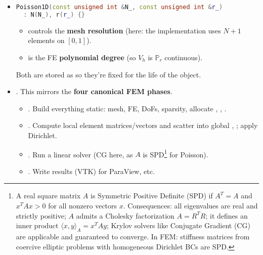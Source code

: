 \begin{itemize}
    \item {}
    \begin{lstlisting}[language=C++]
Poisson1D(const unsigned int &N_, const unsigned int &r_)
  : N(N_), r(r_) {}\end{lstlisting}
    \begin{itemize}
        \item {} controls the \textbf{mesh resolution} (here: the implementation uses $N+1$ elements on $\left[0,1\right]$).
        \item {} is the FE \textbf{polynomial degree} (so $V_{h}$ is $\mathbb{P}_{r}$ continuous).
    \end{itemize}
    Both are stored as  so they're fixed for the life of the object.


    \item {}. This mirrors the \textbf{four canonical FEM phases}.
    \begin{itemize}
        \item {}. Build everything static: mesh, FE, DoFs, sparsity, allocate , , .
        \item {}. Compute local element matrices/vectors and scatter into global , ; apply Dirichlet.
        \item {}. Run a linear solver (CG here, as $A$ is SPD\footnote{%
            A real square matrix $A$ is Symmetric Positive Definite (SPD) if $A^T = A$ and $x^T A x > 0$ for all nonzero vectors $x$. Consequences: all eigenvalues are real and strictly positive; $A$ admits a Cholesky factorization $A = R^T R$; it defines an inner product $\langle x,y\rangle_A = x^T A y$; Krylov solvers like Conjugate Gradient (CG) are applicable and guaranteed to converge. In FEM: stiffness matrices from coercive elliptic problems with homogeneous Dirichlet BCs are SPD.
        } for Poisson).
        \item {}. Write results (VTK) for ParaView, etc.
    \end{itemize}
\end{itemize}

